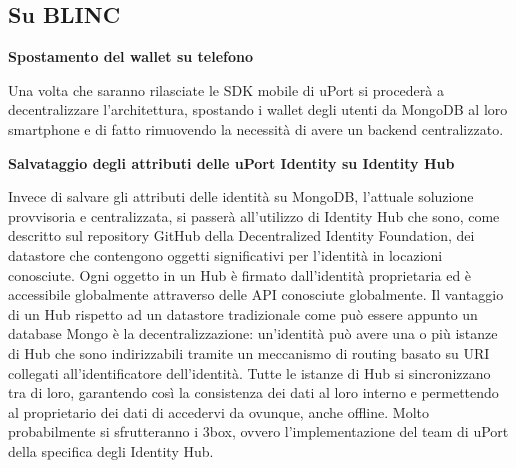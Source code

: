 \subsection{Su BLINC}

\textbf{Spostamento del wallet su telefono}

Una volta che saranno rilasciate le SDK mobile di uPort si procederà a decentralizzare
l’architettura, spostando i wallet degli utenti da MongoDB al loro smartphone e di fatto
rimuovendo la necessità di avere un backend centralizzato.

\textbf{Salvataggio degli attributi delle uPort Identity su Identity Hub}

Invece di salvare gli attributi delle identità su MongoDB, l’attuale soluzione provvisoria
e centralizzata, si passerà all’utilizzo di Identity Hub che sono, come descritto
sul repository GitHub della Decentralized Identity Foundation, dei datastore che contengono
oggetti significativi per l’identità in locazioni conosciute. Ogni oggetto in un Hub è firmato
dall’identità proprietaria ed è accessibile globalmente attraverso delle API conosciute globalmente.
Il vantaggio di un Hub rispetto ad un datastore tradizionale come può essere appunto un database
Mongo è la decentralizzazione: un’identità può avere una o più istanze di Hub che sono indirizzabili
tramite un meccanismo di routing basato su URI collegati all’identificatore dell’identità.
Tutte le istanze di Hub si sincronizzano tra di loro, garantendo così la consistenza dei dati
al loro interno e permettendo al proprietario dei dati di accedervi da ovunque, anche offline.
Molto probabilmente si sfrutteranno i 3box,
ovvero l’implementazione del team di uPort della specifica degli Identity Hub.